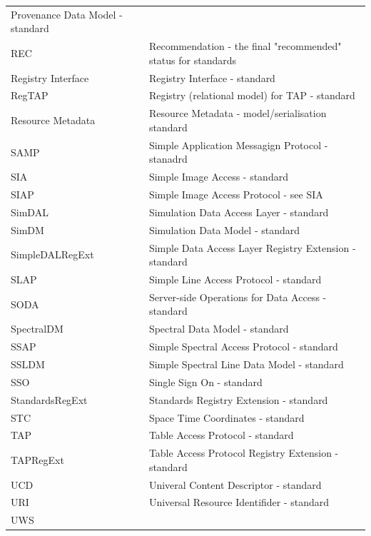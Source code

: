 \documentclass[11pt,letter]{ivoa}
\begin{document}
{\begin{longtable}[t]{l l}
        {Provenance Data Model - standard} \\
        {REC} &
{Recommendation - the final "recommended" status for standards} \\        {Registry Interface} &
        {Registry Interface - standard} \\
        {RegTAP} &
        {Registry (relational model) for TAP - standard} \\
        {Resource Metadata} &
        {Resource Metadata - model/serialisation standard} \\
        {SAMP} &
        {Simple Application Messagign Protocol - stanadrd} \\
        {SIA} &
        {Simple Image Access - standard} \\
        {SIAP} &
        {Simple Image Access Protocol - see SIA}  \\
        {SimDAL} &
        {Simulation Data Access Layer - standard} \\
        {SimDM} &
        {Simulation Data Model - standard} \\
        {SimpleDALRegExt} &
        {Simple Data Access Layer Registry Extension - standard} \\
        {SLAP} &
        {Simple Line Access Protocol - standard} \\
        {SODA}  &
        {Server-side Operations for Data Access - standard} \\
        {SpectralDM} &
        {Spectral Data Model - standard} \\
        {SSAP} &
        {Simple Spectral Access Protocol - standard} \\
        {SSLDM} &
        {Simple Spectral Line Data Model - standard} \\
        {SSO} &
        {Single Sign On - standard} \\
        {StandardsRegExt} &
        {Standards Registry Extension - standard} \\
        {STC} &
        {Space Time Coordinates - standard} \\
        {TAP} &
        {Table Access Protocol - standard} \\
        {TAPRegExt} &
        {Table Access Protocol Registry Extension - standard} \\
        {UCD} &
        {Univeral Content Descriptor - standard} \\
        {URI}  &
        {Universal Resource Identifider - standard} \\
        {UWS}  &

\end{longtable}}
\end{document}
